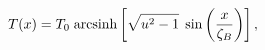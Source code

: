 \begin{equation}
T(x)=T_{0}\;{\rm arcsinh}\left[
\sqrt{u^{2}-1}
\;\sin\left(\frac{x}{\zeta_B}
\right)\right],
\end{equation}

